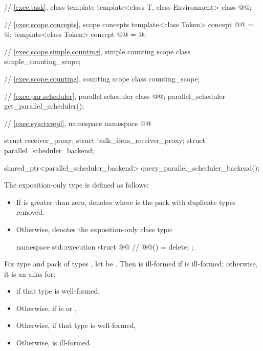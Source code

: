 \begin{codeblock}
{  // \ref{exec.task}, class template 
  template<class T, class Environment>
    class @@;

  // \ref{exec.scope.concepts}, scope concepts
  template<class Token>
    concept @@ = @\seebelow@;
  template<class Token>
    concept @@ = @\seebelow@;

  // \ref{exec.scope.simple.counting}, simple counting scope
  class simple_counting_scope;

  // \ref{exec.scope.counting}, counting scope
  class counting_scope;

  // \ref{exec.par.scheduler}, parallel scheduler
  class @@;
  parallel_scheduler get_parallel_scheduler();

  // \ref{exec.sysctxrepl}, namespace 
  namespace @@ {
    struct receiver_proxy;
    struct bulk_item_receiver_proxy;
    struct parallel_scheduler_backend;

    shared_ptr<parallel_scheduler_backend> query_parallel_scheduler_backend();
  }
}
\end{codeblock}

\pnum
The exposition-only type 
is defined as follows:
\begin{itemize}
\item
If  is greater than zero,
 denotes 
where  is the pack 
with duplicate types removed.
\item
Otherwise,  denotes
the exposition-only class type:
\begin{codeblock}
namespace std::execution {
  struct @@ {        // \expos
    @@() = delete;
  };
}
\end{codeblock}
\end{itemize}

\pnum
For type  and pack of types ,
let  be .
Then  is ill-formed
if  is ill-formed;
otherwise, it is an alias for:
\begin{itemize}
\item
{}
if that type is well-formed,
\item
Otherwise, 
if  is
 or ,
\item
Otherwise, 
if that\linebreak{} type is well-formed,
\item
Otherwise,  is ill-formed.
\end{itemize}

